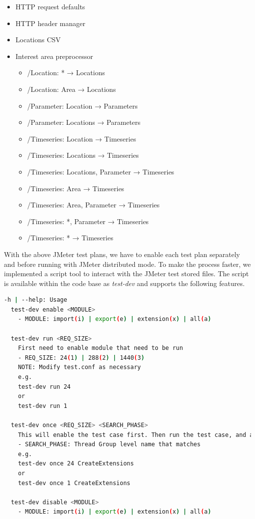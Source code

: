 \begin{itemize}
    \item HTTP request defaults
    \item HTTP header manager
    \item Locations CSV
    \item Interest area preprocessor
    \begin{itemize}
        \item /Location: * → Locations
    	\item /Location: Area → Locations
    	\item /Parameter: Location → Parameters
    	\item /Parameter: Locations → Parameters
    	\item /Timeseries: Location → Timeseries
    	\item /Timeseries: Locations → Timeseries
    	\item /Timeseries: Locations, Parameter → Timeseries
    	\item /Timeseries: Area → Timeseries
    	\item /Timeseries: Area, Parameter → Timeseries
    	\item /Timeseries: *, Parameter → Timeseries
    	\item /Timeseries: * → Timeseries
	\end{itemize}
\end{itemize}

With the above JMeter test plans, we have to enable each test plan separately and before running with JMeter distributed mode. To make the process faster, we implemented a script tool to interact with the JMeter test stored files. The script is available within the code base \cite{KarunarathneWdias-performance-test/TEST_PLAN.md:Plan} as \emph{test-dev} and supports the following features.

\begin{lstlisting}[language=sh, caption=Automated performance test plans.]
-h | --help: Usage
  test-dev enable <MODULE>
    - MODULE: import(i) | export(e) | extension(x) | all(a)

  test-dev run <REQ_SIZE>
    First need to enable module that need to be run
    - REQ_SIZE: 24(1) | 288(2) | 1440(3)
    NOTE: Modify test.conf as necessary
    e.g.
    test-dev run 24
    or
    test-dev run 1

  test-dev once <REQ_SIZE> <SEARCH_PHASE>
    This will enable the test case first. Then run the test case, and at the end disable and exit.
    - SEARCH_PHASE: Thread Group level name that matches
    e.g.
    test-dev once 24 CreateExtensions
    or
    test-dev once 1 CreateExtensions

  test-dev disable <MODULE>
    - MODULE: import(i) | export(e) | extension(x) | all(a)
\end{lstlisting}

